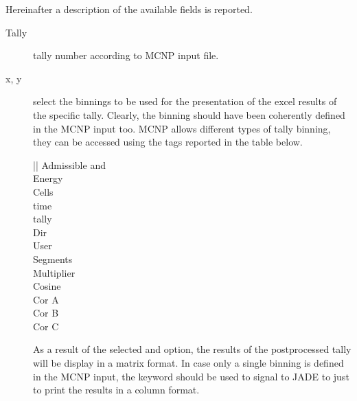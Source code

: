 \documentclass[letterpaper,10pt,english]{sphinxmanual}
\begin{document}
\sphinxAtStartPar
Hereinafter a description of the available fields is reported.
\begin{description}
\item[{Tally}] \leavevmode
\sphinxAtStartPar
tally number according to MCNP input file.

\item[{x, y}] \leavevmode
\sphinxAtStartPar
select the binnings to be used for the presentation of the excel results of the specific tally. Clearly,
the binning should have been coherently defined in the MCNP input too. MCNP allows different types of tally binning,
they can be accessed using the tags reported in the table below.


\begin{savenotes}\sphinxattablestart
\centering
{}
\sphinxthecaptionisattop
{}\label{\detokenize{usage/configuration:id1}}
\sphinxaftertopcaption
\begin{tabular}[t]{||}
\hline
\sphinxstyletheadfamily 
\sphinxAtStartPar
Admissible  and 
\\
\hline
\sphinxAtStartPar
Energy
\\
\hline
\sphinxAtStartPar
Cells
\\
\hline
\sphinxAtStartPar
time
\\
\hline
\sphinxAtStartPar
tally
\\
\hline
\sphinxAtStartPar
Dir
\\
\hline
\sphinxAtStartPar
User
\\
\hline
\sphinxAtStartPar
Segments
\\
\hline
\sphinxAtStartPar
Multiplier
\\
\hline
\sphinxAtStartPar
Cosine
\\
\hline
\sphinxAtStartPar
Cor A
\\
\hline
\sphinxAtStartPar
Cor B
\\
\hline
\sphinxAtStartPar
Cor C
\\
\hline
\end{tabular}
\par
\sphinxattableend\end{savenotes}

\sphinxAtStartPar
As a result of the selected  and  option, the results of the post\sphinxhyphen{}processed tally will be display in a
matrix format. In case only a single binning is defined in the MCNP input, the  keyword should be used to
signal to JADE to just to print the results in a column format.


\end{description}
\end{document}
